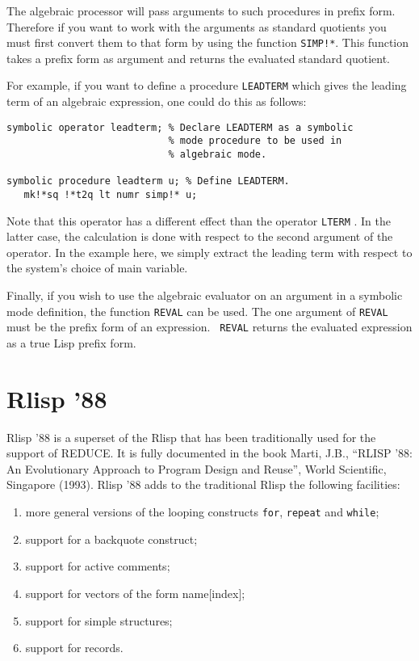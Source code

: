 \documentclass[11pt,letterpaper]{book}
\makeatletter
\newcommand{\underscore}{\_}
\newcommand{\ttindex}[1]{{\renewcommand{\_}{\protect\underscore}%
                          \index{#1@{\tt #1}}}}
\makeatother
\begin{document}
The algebraic processor will pass arguments to such procedures in prefix
form. Therefore if you want to work with the arguments as standard
quotients you must first convert them to that form by using the function
{\tt SIMP!*}. This function takes a prefix form as argument and returns the
evaluated standard quotient.

For example, if you want to define a procedure {\tt LEADTERM} which gives the
leading term of an algebraic expression, one could do this as follows:
\begin{samepage}
{\small\begin{verbatim}
symbolic operator leadterm; % Declare LEADTERM as a symbolic
                            % mode procedure to be used in
                            % algebraic mode.

symbolic procedure leadterm u; % Define LEADTERM.
   mk!*sq !*t2q lt numr simp!* u;
\end{verbatim}}
\end{samepage}
Note that this operator has a different effect than the operator {\tt LTERM}
\ttindex{LTERM}.  In the latter case, the calculation is done
with respect to the second argument of the operator.  In the example here,
we simply extract the leading term with respect to the system's choice of
main variable.

Finally, if you wish to use the algebraic evaluator on an argument in a
symbolic mode definition, the function {\tt REVAL} can be used.  The one
argument of {\tt REVAL} must be the prefix form of an expression. {\tt
REVAL} returns the evaluated expression as a true Lisp prefix form.

\section{Rlisp '88}

Rlisp '88 is a superset of the Rlisp that has been traditionally used for
the support of REDUCE.  It is fully documented in the book
Marti, J.B., ``{RLISP} '88:  An Evolutionary Approach to Program Design
and Reuse'', World Scientific, Singapore (1993).
Rlisp '88 adds to the traditional Rlisp the following facilities:
\begin{enumerate}
\item more general versions of the looping constructs {\tt for},
{\tt repeat} and {\tt while};

\item support for a backquote construct;

\item support for active comments;

\item support for vectors of the form name[index];

\item support for simple structures;

\item support for records.
\end{enumerate}
\end{document}
